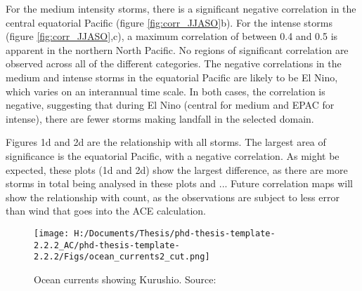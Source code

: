 For the medium intensity storms, there is a significant negative correlation in the central equatorial Pacific (figure \ref{fig:corr_JJASO}b). For the intense storms (figure \ref{fig:corr_JJASO},c), a maximum correlation of between 0.4 and 0.5 is apparent in the northern North Pacific. No regions of significant correlation are observed across all of the different categories.
The negative correlations in the medium and intense storms in the equatorial Pacific are likely to be El Nino, which varies on an interannual time scale. In both cases, the correlation is negative, suggesting that during El Nino (central for medium and EPAC for intense), there are fewer storms making landfall in the selected domain.

Figures 1d and 2d are the relationship with all storms. The largest area of significance is the equatorial Pacific, with a negative correlation. As might be expected, these plots (1d and 2d) show the largest difference, as there are more storms in total being analysed in these plots and ...
Future correlation maps will show the relationship with count, as the observations are subject to less error than wind that goes into the ACE calculation.


\begin{figure}
	\centering
	\noindent\texttt{[image: H:/Documents/Thesis/phd-thesis-template-2.2.2\_AC/phd-thesis-template-2.2.2/Figs/ocean\_currents2\_cut.png]}
	\caption{Ocean currents showing Kurushio. Source: \citep{kuroshio}}\label{fig:kuroshio}
\end{figure}


